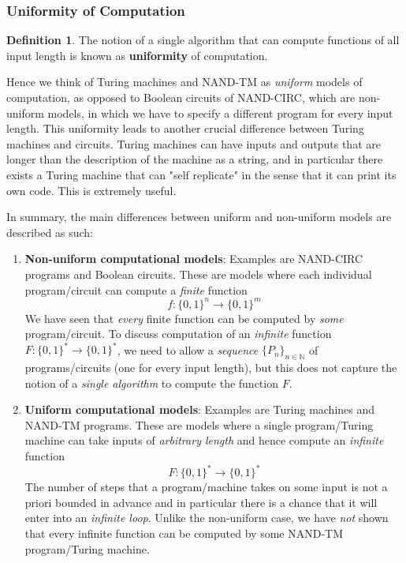 \documentclass[a4paper, 12pt]{report}
\theoremstyle{remark}
\theoremstyle{definition}
\newtheorem{definition}{Definition}[section]
\begin{document}
\subsubsection{Uniformity of Computation}
\begin{definition}
The notion of a single algorithm that can compute functions of all input length is known as \textbf{uniformity} of computation. 
\end{definition}

Hence we think of Turing machines and NAND-TM as \textit{uniform} models of computation, as opposed to Boolean circuits of NAND-CIRC, which are non-uniform models, in which we have to specify a different program for every input length. This uniformity leads to another crucial difference between Turing machines and circuits. Turing machines can have inputs and outputs that are longer than the description of the machine as a string, and in particular there exists a Turing machine that can "self replicate" in the sense that it can print its own code. This is extremely useful. 

In summary, the main differences between uniform and non-uniform models are described as such: 
\begin{enumerate}
    \item \textbf{Non-uniform computational models}: Examples are NAND-CIRC programs and Boolean circuits. These are models where each individual program/circuit can compute a \textit{finite} function 
    \[f: \{0,1\}^n \longrightarrow \{0,1\}^m\]
    We have seen that \textit{every} finite function can be computed by \textit{some} program/circuit. To discuss computation of an \textit{infinite} function $F: \{0,1\}^* \longrightarrow \{0,1\}^*$, we need to allow a \textit{sequence} $\big\{ P_n \big\}_{n \in \mathbb{N}}$ of programs/circuits (one for every input length), but this does not capture the notion of a \textit{single algorithm} to compute the function $F$. 
    \item \textbf{Uniform computational models}: Examples are Turing machines and NAND-TM programs. These are models where a single program/Turing machine can take inputs of \textit{arbitrary length} and hence compute an \textit{infinite} function 
    \[F: \{0,1\}^* \longrightarrow \{0,1\}^* \]
    The number of steps that a program/machine takes on some input is not a priori bounded in advance and in particular there is a chance that it will enter into an \textit{infinite loop}. Unlike the non-uniform case, we have \textit{not} shown that every infinite function can be computed by some NAND-TM program/Turing machine. 
\end{enumerate}
\end{document}
